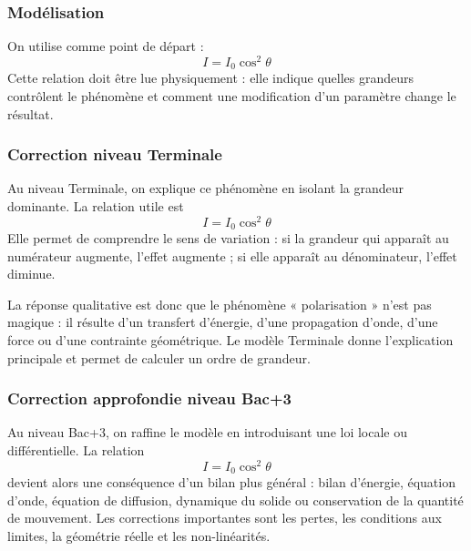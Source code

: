 \documentclass[11pt,a4paper]{article}
\begin{document}
\subsubsection*{Modélisation}

\begin{theorembox}
On utilise comme point de départ :
\[
I=I_0\cos^2\theta
\]
Cette relation doit être lue physiquement : elle indique quelles grandeurs contrôlent le phénomène et comment une modification d'un paramètre change le résultat.
\end{theorembox}

\subsubsection*{Correction niveau Terminale}

\begin{corrigebox}

Au niveau Terminale, on explique ce phénomène en isolant la grandeur dominante. La relation utile est
\[
I=I_0\cos^2\theta
\]
Elle permet de comprendre le sens de variation : si la grandeur qui apparaît au numérateur augmente, l'effet augmente ; si elle apparaît au dénominateur, l'effet diminue.

La réponse qualitative est donc que le phénomène « polarisation » n'est pas magique : il résulte d'un transfert d'énergie, d'une propagation d'onde, d'une force ou d'une contrainte géométrique. Le modèle Terminale donne l'explication principale et permet de calculer un ordre de grandeur.

\end{corrigebox}

\subsubsection*{Correction approfondie niveau Bac+3}

\begin{approfondissementbox}

Au niveau Bac+3, on raffine le modèle en introduisant une loi locale ou différentielle. La relation
\[
I=I_0\cos^2\theta
\]
devient alors une conséquence d'un bilan plus général : bilan d'énergie, équation d'onde, équation de diffusion, dynamique du solide ou conservation de la quantité de mouvement. Les corrections importantes sont les pertes, les conditions aux limites, la géométrie réelle et les non-linéarités.

\end{approfondissementbox}
\end{document}
